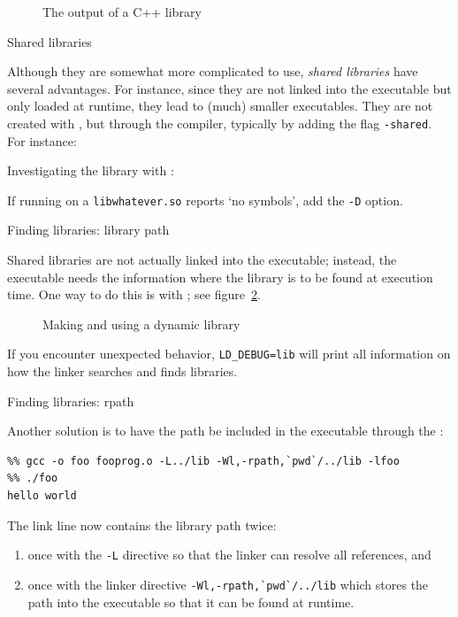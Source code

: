 \begin{figure}[ht]
  \def\tutcodefraction{.5}\def\tutoutputfraction{.45} %
  \caption{The  output of a C++ library}
  \label{fig:cxxstatic}
\end{figure}


 {Shared libraries}

Although they are somewhat more complicated to use, 
\emph{shared libraries}%
have several advantages.
For instance, since they are not linked into the executable but only
loaded at runtime, they lead to (much) smaller executables.
They are
not created with , but through the compiler,
typically by adding the flag \lstinline{-shared}.
For instance:


Investigating the library with :


\begin{remark}
  If running  on a \lstinline{libwhatever.so}
  reports `no symbols', add the \lstinline{-D} option.
\end{remark}

 {Finding libraries: library path}
\label{sec:ld_lib_path}

Shared libraries are not actually linked into the executable;
instead, the executable needs the information where the library
is to be found at execution time. One way to do this is with
;
see figure~\ref{fig:dynamicprogram}.

\begin{figure}[ht]
  \caption{Making and using a dynamic library}
  \label{fig:dynamicprogram}
\end{figure}

If you encounter unexpected behavior, \lstinline{LD_DEBUG=lib}
will print all information on how the linker searches and finds libraries.

 {Finding libraries: rpath}
\label{sec:ld_rpath}

Another solution is to have the path be included in the executable
through the :
\begin{lstlisting}
%% gcc -o foo fooprog.o -L../lib -Wl,-rpath,`pwd`/../lib -lfoo
%% ./foo
hello world
\end{lstlisting}
The link line now contains the library path twice:
\begin{enumerate}
\item once with the \lstinline{-L} directive so that the linker can resolve
  all references, and
\item once with the linker directive \lstinline+-Wl,-rpath,`pwd`/../lib+ which
  stores the path into the executable so that it can be found at runtime.
\end{enumerate}

